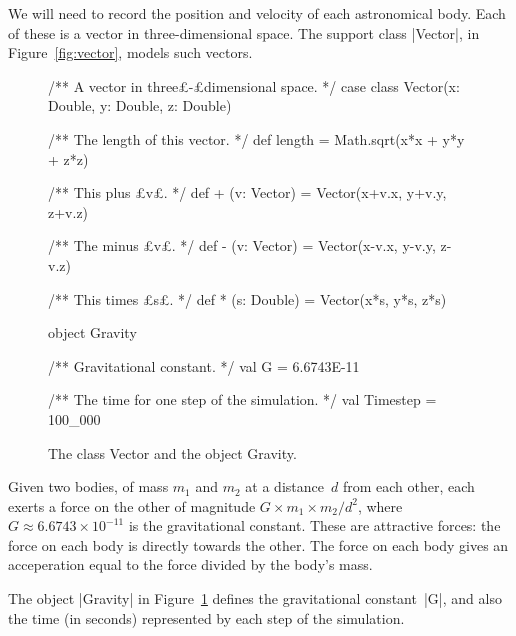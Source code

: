 We will need to record the position and velocity of each astronomical body.
Each of these is a vector in three-dimensional space.  The support class
|Vector|, in Figure~\ref{fig:vector}, models such vectors.


\begin{figure}
\begin{scala}
/** A vector in three£-£dimensional space. */
case class Vector(x: Double, y: Double, z: Double){
  /** The length of this vector. */
  def length = Math.sqrt(x*x + y*y + z*z)

  /** This plus £v£. */
  def + (v: Vector) = Vector(x+v.x, y+v.y, z+v.z)

  /** The minus £v£. */
  def - (v: Vector) = Vector(x-v.x, y-v.y, z-v.z)

  /** This times £s£. */
  def * (s: Double) = Vector(x*s, y*s, z*s)
}

object Gravity{
  /** Gravitational constant. */
  val G = 6.6743E-11

  /** The time for one step of the simulation. */
  val Timestep = 100_000
}
\end{scala}
\caption{The class {\scalashape Vector} and the object {\scalashape Gravity}.}
\label{fig:vector}\label{fig:Gravity}
\end{figure}


Given two bodies, of mass $m_1$ and $m_2$ at a distance~$d$ from each other,
each exerts a force on the other of magnitude $G \times m_1 \times m_2 / d^2$,
where $G \approx 6.6743 \times 10^{-11}$ is the gravitational constant.  These
are attractive forces: the force on each body is directly towards the other.
The force on each body gives an acceperation equal to the force divided by the
body's mass.

The object |Gravity| in Figure~\ref{fig:Gravity} defines the
gravitational constant~|G|, and also the time (in seconds) represented by each
step of the simulation. 


